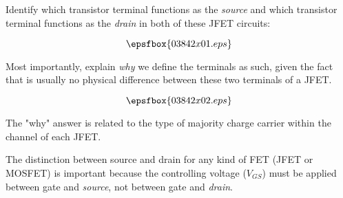 

Identify which transistor terminal functions as the {\it source} and which transistor terminal functions as the {\it drain} in both of these JFET circuits:

$$\epsfbox{03842x01.eps}$$

Most importantly, explain {\it why} we define the terminals as such, given the fact that is usually no physical difference between these two terminals of a JFET.







$$\epsfbox{03842x02.eps}$$

The "why" answer is related to the type of majority charge carrier within the channel of each JFET.







The distinction between source and drain for any kind of FET (JFET or MOSFET) is important because the controlling voltage ($V_{GS}$) must be applied between gate and {\it source}, not between gate and {\it drain}.




